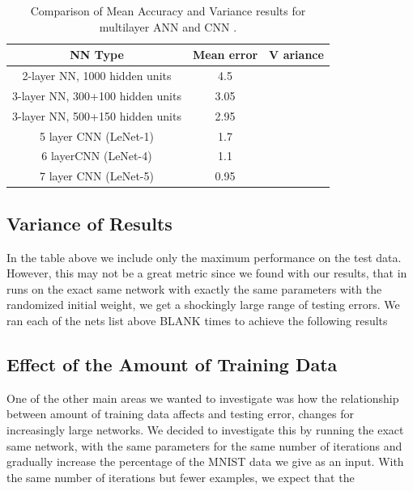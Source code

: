 \documentclass[12pt, twocolumn]{article}
\begin{document}
\begin{table}[t]
	\begin{center}
		\begin{tabular} { |c | c | c | }
			\hline
			NN Type & Mean error &   V ariance\\ \hline
			2-layer NN, 1000 hidden units & 4.5  & \\ \hline
			3-layer NN, 300+100 hidden units & 3.05  &  \\ \hline
			3-layer NN, 500+150 hidden units & 2.95  & \\ \hline
			5 layer CNN  (LeNet-1) & 1.7  & \\ \hline 
			6 layerCNN (LeNet-4) & 1.1 & \\ \hline 
			7 layer CNN (LeNet-5) &  0.95  &\\ \hline
		\end{tabular}
		\label{table: MNISTLeCun}
		\caption{Comparison of Mean Accuracy and Variance results for multilayer ANN and CNN \cite{LeCun1998}.}
	\end{center}
\end{table}

\subsection{Variance of Results}
In the table above we include only the maximum performance on the test data. However, this may not be a great metric since we found with our results, that in runs on the exact same network with exactly the same parameters with the randomized initial weight, we get a shockingly large range of testing errors. We ran each of the nets list above BLANK times  to achieve the following results





\subsection{Effect of the Amount of Training Data}
One of the other main areas we wanted to investigate was how the relationship between amount of training data affects and testing error, changes for increasingly large networks. We decided to investigate this by running the exact same network, with the same parameters for the same number of iterations and gradually increase the percentage of the MNIST data we give as an input. With the same number of iterations but fewer examples, we expect that the  
\end{document}
